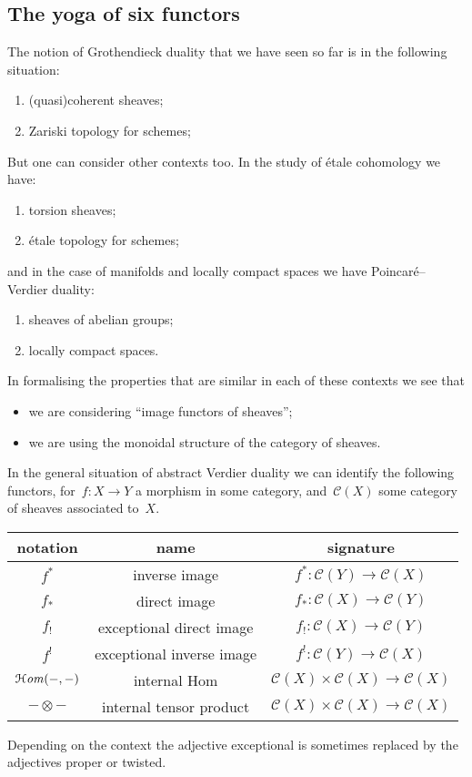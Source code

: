 \documentclass[10pt,a4paper]{article}
\begin{document}
\subsection{The yoga of six functors}
\label{subsection:six-functors-yoga}
The notion of Grothendieck duality that we have seen so far is in the following situation:
\begin{enumerate}
  \item (quasi)coherent sheaves;
  \item Zariski topology for schemes;
\end{enumerate}
But one can consider other contexts too. In the study of \'etale cohomology we have:
\begin{enumerate}
  \item torsion sheaves;
  \item \'etale topology for schemes;
\end{enumerate}
and in the case of manifolds and locally compact spaces we have Poincar\'e--Verdier duality:
\begin{enumerate}
  \item sheaves of abelian groups;
  \item locally compact spaces.
\end{enumerate}

In formalising the properties that are similar in each of these contexts we see that
\begin{itemize}
  \item we are considering ``image functors of sheaves'';
  \item we are using the monoidal structure of the category of sheaves.
\end{itemize}
In the general situation of abstract Verdier duality we can identify the following functors, for~$f\colon X\to Y$ a morphism in some category, and~$\mathcal{C}(X)$ some category of sheaves associated to~$X$.
\begin{center}
  \begin{tabular}{ccc}
    \toprule
    notation & name & signature \\\midrule
    $f^*$ & inverse image & $f^*\colon\mathcal{C}(Y)\to\mathcal{C}(X)$ \\
    $f_*$ & direct image & $f_*\colon\mathcal{C}(X)\to\mathcal{C}(Y)$ \\
    $f_!$ & exceptional direct image & $f_!\colon\mathcal{C}(X)\to\mathcal{C}(Y)$ \\
    $f^!$ & exceptional inverse image & $f^!\colon\mathcal{C}(Y)\to\mathcal{C}(X)$ \\
    $\operatorname{\mathcal{H}\mathit{om}}(-,-)$ & internal Hom & $\mathcal{C}(X)\times\mathcal{C}(X)\to\mathcal{C}(X)$ \\
    $-\otimes-$ & internal tensor product & $\mathcal{C}(X)\times\mathcal{C}(X)\to\mathcal{C}(X)$ \\
    \bottomrule
  \end{tabular}
\end{center}
Depending on the context the adjective exceptional is sometimes replaced by the adjectives proper or twisted.
\end{document}
